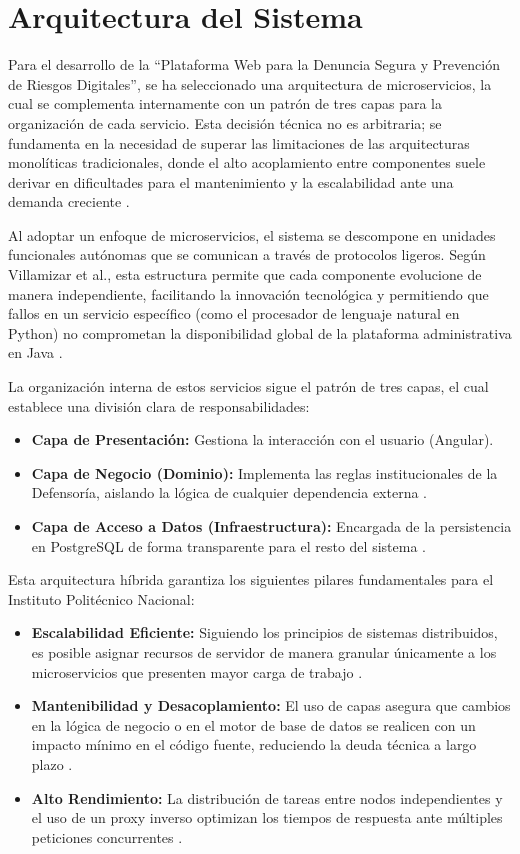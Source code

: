 \section{Arquitectura del Sistema}

Para el desarrollo de la “Plataforma Web para la Denuncia Segura y Prevención de Riesgos Digitales”, se ha seleccionado una arquitectura de microservicios, la cual se complementa internamente con un patrón de tres capas para la organización de cada servicio. Esta decisión técnica no es arbitraria; se fundamenta en la necesidad de superar las limitaciones de las arquitecturas monolíticas tradicionales, donde el alto acoplamiento entre componentes suele derivar en dificultades para el mantenimiento y la escalabilidad ante una demanda creciente \cite{30} .

Al adoptar un enfoque de microservicios, el sistema se descompone en unidades funcionales autónomas que se comunican a través de protocolos ligeros. Según Villamizar et al., esta estructura permite que cada componente evolucione de manera independiente, facilitando la innovación tecnológica y permitiendo que fallos en un servicio específico (como el procesador de lenguaje natural en Python) no comprometan la disponibilidad global de la plataforma administrativa en Java \cite{31} .

La organización interna de estos servicios sigue el patrón de tres capas, el cual establece una división clara de responsabilidades:
\begin{itemize}
\item \textbf{Capa de Presentación:} Gestiona la interacción con el usuario (Angular).
\item \textbf{Capa de Negocio (Dominio):} Implementa las reglas institucionales de la Defensoría, aislando la lógica de cualquier dependencia externa \cite{33}.
\item \textbf{Capa de Acceso a Datos (Infraestructura):} Encargada de la persistencia en PostgreSQL de forma transparente para el resto del sistema \cite{33} .
\end{itemize}

Esta arquitectura híbrida garantiza los siguientes pilares fundamentales para el Instituto Politécnico Nacional:
\begin{itemize}
\item \textbf{Escalabilidad Eficiente:} Siguiendo los principios de sistemas distribuidos, es posible asignar recursos de servidor de manera granular únicamente a los microservicios que presenten mayor carga de trabajo \cite{29} .
\item \textbf{Mantenibilidad y Desacoplamiento:} El uso de capas asegura que cambios en la lógica de negocio o en el motor de base de datos se realicen con un impacto mínimo en el código fuente, reduciendo la deuda técnica a largo plazo \cite{33} .
\item \textbf{Alto Rendimiento:} La distribución de tareas entre nodos independientes y el uso de un proxy inverso optimizan los tiempos de respuesta ante múltiples peticiones concurrentes \cite{29}.
\end{itemize}

